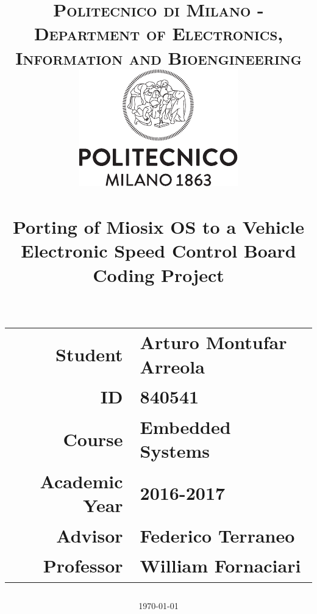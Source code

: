 \documentclass[12pt, english]{scrartcl}
\title{\normalfont \normalsize 
\textsc{Politecnico di Milano - Department of Electronics, Information and Bioengineering} \\[1cm]
\includegraphics[scale=1.2]{polimi} \\[1cm]
\horrule{0.5pt} \\[0.4cm]
\huge \textbf Porting of Miosix OS to a Vehicle Electronic Speed Control Board \\[.5cm] %
\large Coding Project \\ %
\horrule{2pt} \\[0.5cm]
\vfill
\author{}
\begin{tabular}{r l}
\textbf{Student} & Arturo Montufar Arreola \\
\textbf{ID} & 840541 \\[0.5cm]
\textbf{Course} & Embedded Systems \\
\textbf{Academic Year} & 2016-2017 \\[0.5cm]
\textbf{Advisor} & Federico Terraneo \\ %
\textbf{Professor} & William Fornaciari \\
\end{tabular}
\date{\normalsize\today}
}
\begin{document}
\maketitle %

\pagebreak\tableofcontents\pagebreak

%



\pagebreak


\end{document}
